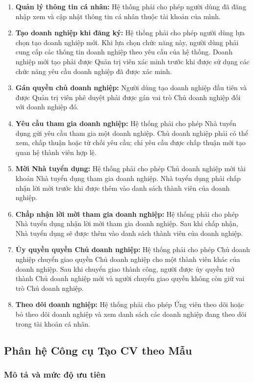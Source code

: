 \begin{enumerate}[label=\bfseries REQ-AUTH-\arabic*:, labelwidth=!, labelsep=0.5em, leftmargin=3.5cm]
    \item \textbf{Quản lý thông tin cá nhân:} Hệ thống phải cho phép người dùng đã đăng nhập xem và cập nhật thông tin cá nhân thuộc tài khoản của mình.
    \item \textbf{Tạo doanh nghiệp khi đăng ký:} Hệ thống phải cho phép người dùng lựa chọn tạo doanh nghiệp mới. Khi lựa chọn chức năng này, người dùng phải cung cấp các thông tin doanh nghiệp theo yêu cầu của hệ thống. Doanh nghiệp mới tạo phải được Quản trị viên xác minh trước khi được sử dụng các chức năng yêu cầu doanh nghiệp đã được xác minh.
    \item \textbf{Gán quyền chủ doanh nghiệp:} Người dùng tạo doanh nghiệp đầu tiên và được Quản trị viên phê duyệt phải được gán vai trò Chủ doanh nghiệp đối với doanh nghiệp đó.
    \item \textbf{Yêu cầu tham gia doanh nghiệp:} Hệ thống phải cho phép Nhà tuyển dụng gửi yêu cầu tham gia một doanh nghiệp. Chủ doanh nghiệp phải có thể xem, chấp thuận hoặc từ chối yêu cầu; chỉ yêu cầu được chấp thuận mới tạo quan hệ thành viên hợp lệ.
    \item \textbf{Mời Nhà tuyển dụng:} Hệ thống phải cho phép Chủ doanh nghiệp mời tài khoản Nhà tuyển dụng tham gia doanh nghiệp. Nhà tuyển dụng phải chấp nhận lời mời trước khi được thêm vào danh sách thành viên của doanh nghiệp.
    \item \textbf{Chấp nhận lời mời tham gia doanh nghiệp:} Hệ thống phải cho phép Nhà tuyển dụng nhận lời mời tham gia doanh nghiệp. Sau khi chấp nhận, Nhà tuyển dụng sẽ được thêm vào danh sách thành viên của doanh nghiệp.
    \item \textbf{Ủy quyền quyền Chủ doanh nghiệp:} Hệ thống phải cho phép Chủ doanh nghiệp chuyển giao quyền Chủ doanh nghiệp cho một thành viên khác của doanh nghiệp. Sau khi chuyển giao thành công, người được ủy quyền trở thành Chủ doanh nghiệp mới và người chuyển giao quyền không còn giữ vai trò Chủ doanh nghiệp.
    \item \textbf{Theo dõi doanh nghiệp:} Hệ thống phải cho phép Ứng viên theo dõi hoặc bỏ theo dõi doanh nghiệp và xem danh sách các doanh nghiệp đang theo dõi trong tài khoản cá nhân.
\end{enumerate}

\subsection{Phân hệ Công cụ Tạo CV theo Mẫu}

\subsubsection{Mô tả và mức độ ưu tiên}


